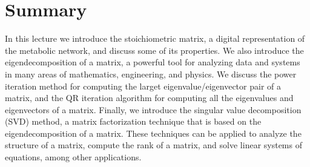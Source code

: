 \documentclass{article}[11pt]
\begin{document}
\section{Summary}
In this lecture we introduce the stoichiometric matrix, a digital representation of the metabolic network, and discuss some of its properties.
We also introduce the eigendecomposition of a matrix, a powerful tool for analyzing data and systems in many areas of mathematics, engineering, and physics.
We discuss the power iteration method for computing the larget eigenvalue/eigenvector pair of a matrix, and the QR iteration algorithm for computing all the eigenvalues and eigenvectors of a matrix.
Finally, we introduce the singular value decomposition (SVD) method, a matrix factorization technique that is based on the eigendecomposition of a matrix.
These techniques can be applied to analyze the structure of a matrix, compute the rank of a matrix, and solve linear systems of equations, among other applications.


\end{document}
